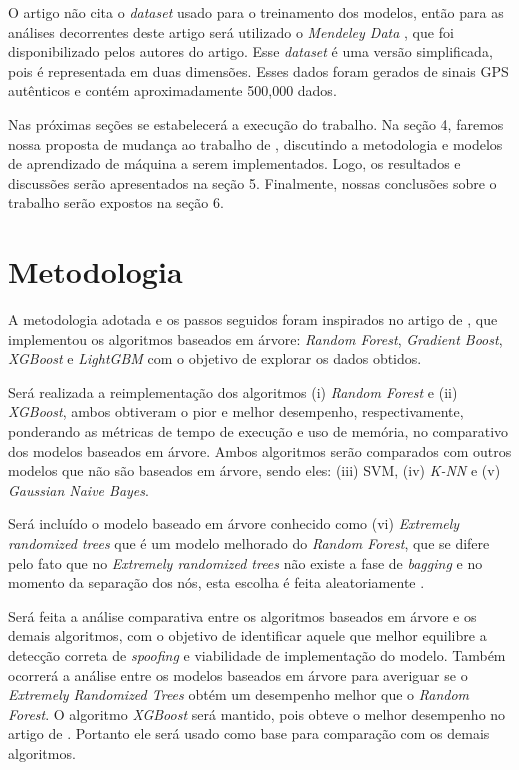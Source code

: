 \documentclass[12pt]{article}
\begin{document}
O artigo \cite{Aissou2021} não cita o \textit{dataset}
usado para o treinamento dos modelos, 
então para as análises decorrentes deste artigo
será utilizado o \textit{Mendeley Data} 
\cite{aissou2022dataset}, que foi disponibilizado pelos autores do artigo. 
Esse \textit{dataset} é uma versão simplificada,
pois é representada em duas dimensões. Esses dados foram gerados de sinais
GPS autênticos e contém aproximadamente 500,000 dados.

Nas próximas seções se estabelecerá a execução do trabalho.
Na seção 4, faremos nossa proposta de mudança
ao trabalho de \cite{Aissou2021}, discutindo a 
metodologia e modelos de aprendizado de máquina a
serem implementados. Logo, os resultados e 
discussões serão apresentados na seção 5.
Finalmente, nossas conclusões sobre o trabalho serão expostos na seção 6.

\section{Metodologia}
A metodologia adotada e os passos seguidos
foram inspirados no artigo de \cite{Aissou2021}, 
que implementou os algoritmos baseados em árvore: 
\textit{Random Forest}, \textit{Gradient Boost}, \textit{XGBoost} e 
\textit{LightGBM} com o objetivo de explorar os dados obtidos.

Será realizada a reimplementação dos algoritmos
(i) \textit{Random Forest} e (ii) \textit{XGBoost},
ambos obtiveram o pior e melhor desempenho,
respectivamente, ponderando as métricas de tempo de execução
e uso de memória, no comparativo dos modelos baseados em árvore.
Ambos algoritmos serão comparados com outros
modelos que não são baseados em árvore,
sendo eles: (iii) SVM, (iv) \textit{K-NN} e
(v) \textit{Gaussian Naive Bayes}.

Será incluído o modelo baseado em árvore conhecido como
(vi) \textit{Extremely randomized trees} que é um modelo melhorado
do \textit{Random Forest}, que se difere pelo fato
que no \textit{Extremely randomized trees} não existe a fase
de \textit{bagging} e no momento da separação dos nós,
esta escolha é feita aleatoriamente \cite{geurtsExtremelyRandomizedTrees2006}.

Será feita a análise comparativa entre os algoritmos baseados em árvore
e os demais algoritmos, com o objetivo de identificar
aquele que melhor equilibre a detecção correta
de \textit{spoofing} e viabilidade de implementação do modelo.
Também ocorrerá a análise entre os modelos baseados em árvore
para averiguar se o \textit{Extremely Randomized Trees}
obtém um desempenho melhor que o \textit{Random Forest}.
O algoritmo \textit{XGBoost}
será mantido, pois obteve o melhor desempenho
no artigo de \cite{Aissou2021}.
Portanto ele será usado como base
para comparação com os demais algoritmos.
\end{document}
